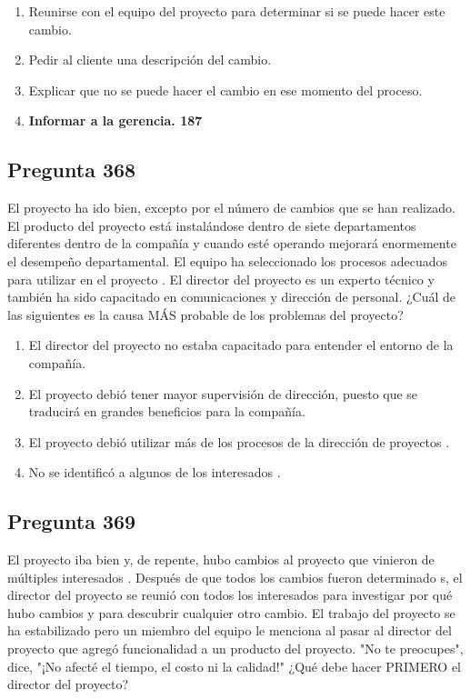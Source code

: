 \documentclass[11pt,a4paper]{article}
\begin{document}
\begin{enumerate}[label=\alph*)]
  \item Reunirse con el equipo del proyecto para determinar si se puede hacer este cambio.
  \item Pedir al cliente una descripción del cambio.
  \item Explicar que no se puede hacer el cambio en ese momento del proceso.
  \item \textbf{Informar a la gerencia. 187}
\end{enumerate}

\subsection*{Pregunta 368}
El proyecto ha ido bien, excepto por el número de cambios que se han realizado. El producto del proyecto está instalándose dentro de siete departamentos diferentes dentro de la compañía y cuando esté operando mejorará enormemente el desempeño departamental. El equipo ha seleccionado los procesos adecuados para utilizar en el proyecto . El director del proyecto es un experto técnico y también ha sido capacitado en comunicaciones y dirección de personal. ¿Cuál de las siguientes es la causa MÁS probable de los problemas del proyecto?

\begin{enumerate}[label=\alph*)]
  \item El director del proyecto no estaba capacitado para entender el entorno de la compañía.
  \item El proyecto debió tener mayor supervisión de dirección, puesto que se traducirá en grandes beneficios para la compañía.
  \item El proyecto debió utilizar más de los procesos de la dirección de proyectos .
  \item No se identificó a algunos de los interesados .
\end{enumerate}

\subsection*{Pregunta 369}
El proyecto iba bien y, de repente, hubo cambios al proyecto que vinieron de múltiples interesados . Después de que todos los cambios fueron determinado s, el director del proyecto se reunió con todos los interesados para investigar por qué hubo cambios y para descubrir cualquier otro cambio. El trabajo del proyecto se ha estabilizado pero un miembro del equipo le menciona al pasar al director del proyecto que agregó funcionalidad a un producto del proyecto. "No te preocupes", dice, "¡No afecté el tiempo, el costo ni la calidad!" ¿Qué debe hacer PRIMERO el director del proyecto?
\end{document}
